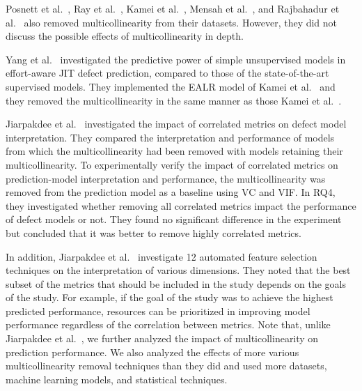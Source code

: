 Posnett et al.~\cite{Posnett2011ASEEcologicalInference}, Ray et al.~\cite{Ray2014FSElaguageandquality}, Kamei et al.~\cite{Kamei2016EMSEjit}, Mensah et al.~\cite{ Mensah2018ISTDuplex}, and Rajbahadur et al.~\cite{Rajbahadur2017MSRRegression} also removed multicollinearity from their datasets. However, they did not discuss the possible effects of multicollinearity in depth.

Yang et al.~\cite{Yang2016FSEunsupervised} investigated the predictive power of simple unsupervised models in effort-aware JIT defect prediction, compared to those of the state-of-the-art supervised models. They implemented the EALR model of Kamei et al.~\cite{Kamei2013TSEjit} and they removed the multicollinearity in the same manner as those Kamei et al.~\cite{Kamei2013TSEjit}.

Jiarpakdee et al.~\cite{Jiarpakdee2019TSE} investigated the impact of correlated metrics on defect model interpretation. They compared the interpretation and performance of models from which the multicollinearity had been removed with models retaining their multicollinearity. To experimentally verify the impact of correlated metrics on prediction-model interpretation and performance, the multicollinearity was removed from the prediction model as a baseline using VC and VIF. 
In RQ4, they investigated whether removing all correlated metrics impact the performance of defect models or not. They found no significant difference in the experiment but concluded that it was better to remove highly correlated metrics. 

In addition, Jiarpakdee et al.~\cite{Jiarpakdee2020EMSEautomated} investigate 12 automated feature selection techniques on the interpretation of various dimensions. They noted that the best subset of the metrics that should be included in the study depends on the goals of the study. For example, if the goal of the study was to achieve the highest predicted performance, resources can be prioritized in improving model performance regardless of the correlation between metrics. 
Note that, unlike Jiarpakdee et al.~\cite{Jiarpakdee2019TSE, Jiarpakdee2020EMSEautomated}, we further analyzed the impact of multicollinearity on prediction performance. We also analyzed the effects of more various multicollinearity removal techniques than they did and used more datasets, machine learning models, and statistical techniques.

